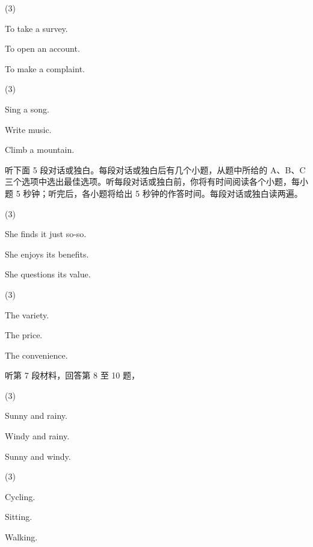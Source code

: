 \documentclass{英语试卷}
\begin{document}
\begin{choices}(3)
  \item To take a survey.
  \item To open an account.
  \item To make a complaint.
\end{choices}
\begin{choices}(3)
  \item Sing a song.
  \item Write music.
  \item Climb a mountain.
\end{choices}
\par 听下面 5 段对话或独白。每段对话或独白后有几个小题，从题中所给的 A、B、C 三个选项中选出最佳选项。听每段对话或独白前，你将有时间阅读各个小题，每小题 5 秒钟；听完后，各小题将给出 5 秒钟的作答时间。每段对话或独白读两遍。\par
{}
\begin{choices}(3)
  \item She finds it just so-so.
  \item She enjoys its benefits.
  \item She questions its value.
\end{choices}
\begin{choices}(3)
  \item The variety.
  \item The price.
  \item The convenience.
\end{choices}
\par 听第 7 段材料，回答第 8 至 10 题，\par
{}
\begin{choices}(3)
  \item Sunny and rainy.
  \item Windy and rainy.
  \item Sunny and windy.
\end{choices}
\begin{choices}(3)
  \item Cycling.
  \item Sitting.
  \item Walking.
\end{choices}
\end{document}
